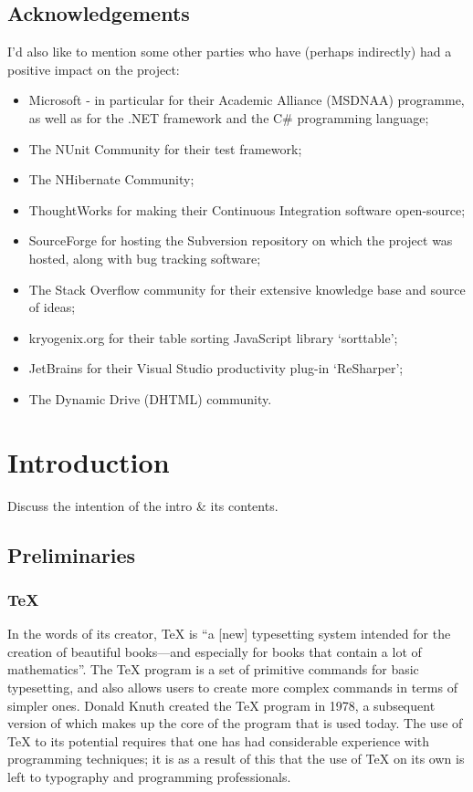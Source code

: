 \documentclass{l4proj}
\begin{document}
\section*{Acknowledgements}
I'd also like to mention some other parties who have (perhaps indirectly) had a positive impact on the project: \
\begin{itemize} 
\item Microsoft - in particular for their Academic Alliance (MSDNAA) programme, as well as for the .NET framework and the C\# programming language;
\item The NUnit Community for their test framework;
\item The NHibernate Community;
\item ThoughtWorks for making their Continuous Integration software open-source;
\item SourceForge for hosting the Subversion repository on which the project was hosted, along with bug tracking software;
\item The Stack Overflow community for their extensive knowledge base and source of ideas;
\item kryogenix.org for their table sorting JavaScript library `sorttable';
\item JetBrains for their Visual Studio productivity plug-in `ReSharper';
\item The Dynamic Drive (DHTML) community.
\end{itemize}

\educationalconsent
%
%
\tableofcontents
\chapter{Introduction}
\label{intro}
Discuss the intention of the intro \& its contents.

\section{Preliminaries}
\subsection{\TeX{}}
In the words of its creator, \TeX{} is ``a [new] typesetting system intended for the creation of beautiful books---and especially for books that contain a lot of mathematics''\cite{DK84}.  The \TeX{} program is a set of primitive commands for basic typesetting, and also allows users to create more complex commands in terms of simpler ones.  Donald Knuth created the \TeX{} program in 1978, a subsequent version of which makes up the core of the program that is used today\cite{TeXOrigin}.  The use of \TeX{} to its potential requires that one has had considerable experience with programming techniques; it is as a result of this that the use of \TeX{} on its own is left to typography and programming professionals\cite{KD95}.
\end{document}
